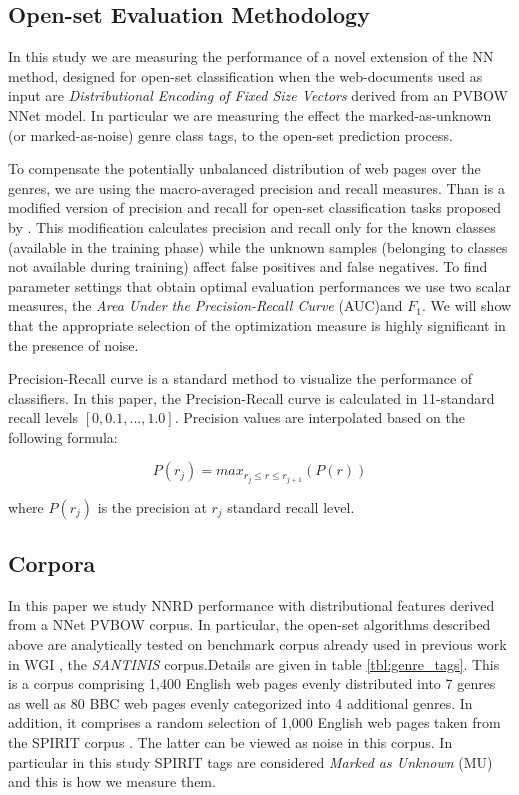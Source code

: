 \subsection{Open-set Evaluation Methodology}
In this study we are measuring the performance of a novel extension of the NN method, designed for open-set classification when the web-documents used as input are \textit{Distributional Encoding of Fixed Size Vectors} derived from an PVBOW NNet model. In particular we are measuring the effect the marked-as-unknown (or marked-as-noise) genre class tags, to the open-set prediction process.

To compensate the potentially unbalanced distribution of web pages over the genres, we are using the macro-averaged precision and recall measures. Than is a modified version of precision and recall for open-set classification tasks proposed by \cite{mendesjunior2016}. This modification calculates precision and recall only for the known classes (available in the training phase) while the unknown samples (belonging to classes not available during training) affect false positives and false negatives. To find parameter settings that obtain optimal evaluation performances we use two scalar measures, the \textit{Area Under the Precision-Recall Curve} (AUC)and $F_{1}$. We will show that the appropriate selection of the optimization measure is highly significant in the presence of noise.

Precision-Recall curve is a standard method to visualize the performance of classifiers. In this paper, the Precision-Recall curve is calculated in 11-standard recall levels $[0,0.1,...,1.0]$. Precision values are interpolated based on the following formula:

\begin{equation}
	P(r_j)=max_{r_j \leqslant r \leqslant r_{j+1}}(P(r))
\end{equation}

\noindent
where $P(r_j)$ is the precision at $r_j$ standard recall level.

\subsection{Corpora}\label{sec:corpora}
In this paper we study NNRD performance with distributional features derived from a NNet PVBOW corpus. In particular, the open-set algorithms described above are analytically tested on benchmark corpus already used in previous work in WGI \citep{meyer2004genre,santini2007automatic,kanaris2009learning,pritsos2018open}, the \textit{SANTINIS} \cite{mehler2010genres_on_web} corpus.Details are given in table \ref{tbl:genre_tags}. This is a corpus comprising 1,400 English web pages evenly distributed into 7 genres as well as 80 BBC web pages evenly categorized into 4 additional genres. In addition, it comprises a random selection of 1,000 English web pages taken from the SPIRIT corpus \cite{joho2004spirit}. The latter can be viewed as noise in this corpus. In particular in this study SPIRIT tags are considered \textit{Marked as Unknown} (MU) and this is how we measure them.

